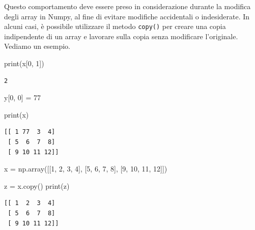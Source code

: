 \documentclass[
  letterpaper,
  krantz2]{{[}./krantz{]}}
\newenvironment{Shaded}{\begin{snugshade}}{\end{snugshade}}
\newcommand{\BuiltInTok}[1]{\textcolor[rgb]{0.00,0.23,0.31}{#1}}
\newcommand{\DecValTok}[1]{\textcolor[rgb]{0.68,0.00,0.00}{#1}}
\newcommand{\NormalTok}[1]{\textcolor[rgb]{0.00,0.23,0.31}{#1}}
\newcommand{\OperatorTok}[1]{\textcolor[rgb]{0.37,0.37,0.37}{#1}}
\begin{document}
Questo comportamento deve essere preso in considerazione durante la
modifica degli array in Numpy, al fine di evitare modifiche accidentali
o indesiderate. In alcuni casi, è possibile utilizzare il metodo
\texttt{copy()} per creare una copia indipendente di un array e lavorare
sulla copia senza modificare l'originale. Vediamo un esempio.

\begin{Shaded}
\begin{Highlighting}[]
\BuiltInTok{print}\NormalTok{(x[}\DecValTok{0}\NormalTok{, }\DecValTok{1}\NormalTok{])   }
\end{Highlighting}
\end{Shaded}

\begin{verbatim}
2
\end{verbatim}

\begin{Shaded}
\begin{Highlighting}[]
\NormalTok{y[}\DecValTok{0}\NormalTok{, }\DecValTok{0}\NormalTok{] }\OperatorTok{=} \DecValTok{77}     
\end{Highlighting}
\end{Shaded}

\begin{Shaded}
\begin{Highlighting}[]
\BuiltInTok{print}\NormalTok{(x)}
\end{Highlighting}
\end{Shaded}

\begin{verbatim}
[[ 1 77  3  4]
 [ 5  6  7  8]
 [ 9 10 11 12]]
\end{verbatim}

\begin{Shaded}
\begin{Highlighting}[]
\NormalTok{x }\OperatorTok{=}\NormalTok{ np.array([[}\DecValTok{1}\NormalTok{, }\DecValTok{2}\NormalTok{, }\DecValTok{3}\NormalTok{, }\DecValTok{4}\NormalTok{], [}\DecValTok{5}\NormalTok{, }\DecValTok{6}\NormalTok{, }\DecValTok{7}\NormalTok{, }\DecValTok{8}\NormalTok{], [}\DecValTok{9}\NormalTok{, }\DecValTok{10}\NormalTok{, }\DecValTok{11}\NormalTok{, }\DecValTok{12}\NormalTok{]])}

\NormalTok{z }\OperatorTok{=}\NormalTok{ x.copy()}
\BuiltInTok{print}\NormalTok{(z)}
\end{Highlighting}
\end{Shaded}

\begin{verbatim}
[[ 1  2  3  4]
 [ 5  6  7  8]
 [ 9 10 11 12]]
\end{verbatim}
\end{document}
